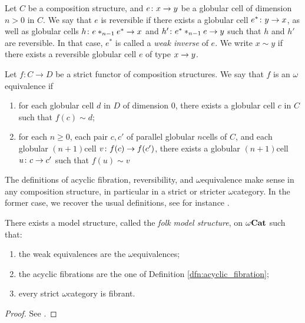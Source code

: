 \begin{dfn} 
    Let \( C \) be a composition structure, and \( e \colon x \to y \) be a globular cell of dimension \( n > 0 \) in \( C \).
    We say that \( e \) is reversible if there exists a globular cell \( e^* \colon y \to x \), as well as globular cells \( h \colon e *_{n - 1} e^* \to x \) and \( h' \colon e^* *_{n - 1} e \to y \) such that \( h \) and \( h' \) are reversible.
    In that case, \( e^* \) is called a \emph{weak inverse} of \( e \).
    We write \( x \sim y \) if there exists a reversible globular cell \( e \) of type \( x \to y \).
\end{dfn}

\begin{dfn} 
    Let \( f \colon C \to D \) be a strict functor of composition structures.
    We say that \( f \) is an \( \omega \)\nbd equivalence if
    \begin{enumerate}
        \item for each globular cell \( d \) in \( D \) of dimension \( 0 \), there exists a globular cell \( c \) in \( C \) such that \( f(c) \sim d \);
        \item for each \( n \geq 0 \), each pair \( c, c' \) of parallel globular \( n \)\nbd cells of \( C \), and each globular \( (n + 1) \)\nbd cell \( v \colon f(c) \to f(c') \), there exists a globular \( (n + 1) \)\nbd cell \( u \colon c \to c' \) such that \( f(u) \sim v \)
    \end{enumerate}
\end{dfn}

\begin{comm}
    The definitions of acyclic fibration, reversibility, and \( \omega \)\nbd equivalence make sense in any composition structure, in particular in a strict or stricter \( \omega \)\nbd category.
    In the former case, we recover the usual definitions, see for instance \cite[19.2.3, 20.1.1, 20.1.11]{ara2025polygraphs}.
\end{comm}

\begin{thm} \label{thm:folk_model_structure}
    There exists a model structure, called the \emph{folk model structure}, on \( {\omega\mathbf{Cat}} \) such that:
    \begin{enumerate}
        \item the weak equivalences are the \( \omega \)\nbd equivalences;
        \item the acyclic fibrations are the one of Definition \ref{dfn:acyclic_fibration};
        \item every strict \( \omega \)\nbd category is fibrant. 
    \end{enumerate} 
\end{thm}
\begin{proof} 
    See \cite{lafont2010folk}.
\end{proof}

